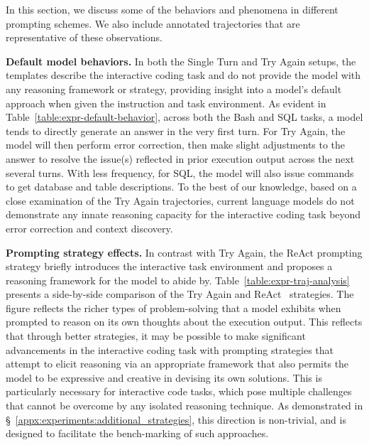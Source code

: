 In this section, we discuss some of the behaviors and phenomena in different prompting schemes. We also include annotated trajectories that are representative of these observations.



\textbf{Default model behaviors.} In both the Single Turn and Try Again setups, the templates describe the interactive coding task and do not provide the model with any reasoning framework or strategy, providing insight into a model's default approach when given the instruction and task environment. As evident in Table~\ref{table:expr-default-behavior}, across both the Bash and SQL tasks, a model tends to directly generate an answer in the very first turn. For Try Again, the model will then perform error correction, then make slight adjustments to the answer to resolve the issue(s) reflected in prior execution output across the next several turns. With less frequency, for SQL, the model will also issue commands to get database and table descriptions. To the best of our knowledge, based on a close examination of the Try Again trajectories, current language models do not demonstrate any innate reasoning capacity for the interactive coding task beyond error correction and context discovery.



\textbf{Prompting strategy effects.} In contrast with Try Again, the ReAct prompting strategy briefly introduces the interactive task environment and proposes a reasoning framework for the model to abide by. Table~\ref{table:expr-traj-analysis} presents a side-by-side comparison of the Try Again and ReAct~\cite{yao2023react} strategies. The figure reflects the richer types of problem-solving that a model exhibits when prompted to reason on its own thoughts about the execution output. This reflects that through better strategies, it may be possible to make significant advancements in the interactive coding task with prompting strategies that attempt to elicit reasoning via an appropriate framework that also permits the model to be expressive and creative in devising its own solutions. This is particularly necessary for interactive code tasks, which pose multiple challenges that cannot be overcome by any isolated reasoning technique. As demonstrated in \S~\ref{appx:experiments:additional_strategies}, this direction is non-trivial, and \benchmark{} is designed to facilitate the bench-marking of such approaches.

